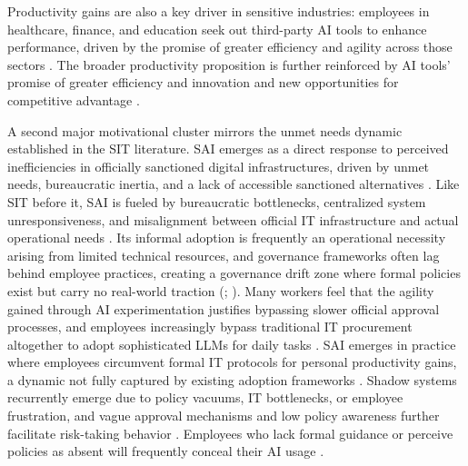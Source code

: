 \documentclass[12pt,oneside]{article}
\begin{document}
Productivity gains are also a key driver in sensitive industries: employees in healthcare, finance, and education seek out third-party \ac{AI} tools to enhance performance, driven by the promise of greater efficiency and agility across those sectors \citep[2, 16]{balogun2025ethical}. The broader productivity proposition is further reinforced by \ac{AI} tools' promise of greater efficiency and innovation and new opportunities for competitive advantage \citep[973]{puthal2025shadowai}.

A second major motivational cluster mirrors the unmet needs dynamic established in the \ac{SIT} literature. \ac{SAI} emerges as a direct response to perceived inefficiencies in officially sanctioned digital infrastructures, driven by unmet needs, bureaucratic inertia, and a lack of accessible sanctioned alternatives \citep[2, 6]{ross2025shadowai}. Like \ac{SIT} before it, \ac{SAI} is fueled by bureaucratic bottlenecks, centralized system unresponsiveness, and misalignment between official \ac{IT} infrastructure and actual operational needs \citep[1]{ross2025shadowai}. Its informal adoption is frequently an operational necessity arising from limited technical resources, and governance frameworks often lag behind employee practices, creating a governance drift zone where formal policies exist but carry no real-world traction (\citealp[1]{ross2025shadowai}; \citealp[1]{silic2025shadow}). Many workers feel that the agility gained through \ac{AI} experimentation justifies bypassing slower official approval processes, and employees increasingly bypass traditional \ac{IT} procurement altogether to adopt sophisticated \ac{LLM}s for daily tasks \citep[1136]{raizada2026shadowai}. \ac{SAI} emerges in practice where employees circumvent formal \ac{IT} protocols for personal productivity gains, a dynamic not fully captured by existing adoption frameworks \citep[3]{silic2025shadow}. Shadow systems recurrently emerge due to policy vacuums, \ac{IT} bottlenecks, or employee frustration, and vague approval mechanisms and low policy awareness further facilitate risk-taking behavior \citep[1138, 1140]{raizada2026shadowai}. Employees who lack formal guidance or perceive policies as absent will frequently conceal their \ac{AI} usage \citep[2]{varshini2025facing}.
\end{document}
